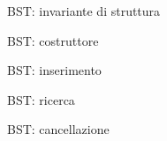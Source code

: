 \documentclass{beamer}
\begin{document}
\begin{frame}{BST: invariante di struttura}
    
\end{frame}

\begin{frame}{BST: costruttore}
    
\end{frame}

\begin{frame}{BST: inserimento}
    
\end{frame}

\begin{frame}{BST: ricerca}
    
\end{frame}

\begin{frame}{BST: cancellazione}
    \only<1>{
        
    }
\end{frame}
\end{document}
